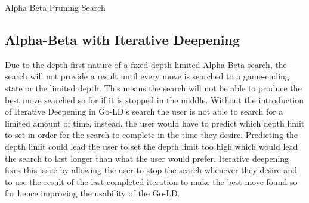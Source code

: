 \documentclass{l4proj}
\begin{document}
\begin{algorithm}[H]
\caption{Alpha Beta Pruning Search}\label{Alpha-Beta}
    \DontPrintSemicolon
\end{algorithm}


\subsection{Alpha-Beta with Iterative Deepening}

Due to the depth-first nature of a fixed-depth limited Alpha-Beta search, the search will not provide a result until every move is searched to a game-ending state or the limited depth. This means the search will not be able to produce the best move searched so for if it is stopped in the middle. Without the introduction of Iterative Deepening in Go-LD’s search the user is not able to search for a limited amount of time, instead, the user would have to predict which depth limit to set in order for the search to complete in the time they desire. Predicting the depth limit could lead the user to set the depth limit too high which would lead the search to last longer than what the user would prefer. Iterative deepening fixes this issue by allowing the user to stop the search whenever they desire and to use the result of the last completed iteration to make the best move found so far hence improving the usability of the Go-LD.
\end{document}
